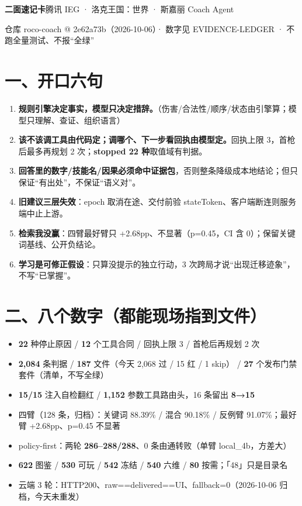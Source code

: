 \documentclass[10pt,a4paper,fontset=fandol]{ctexart}
\newcommand{\x}[1]{\textcolor{mainblue}{\textbf{#1}}}
\begin{document}
{\LARGE\bfseries 二面速记卡}\hfill{\small\color{subgray}腾讯 IEG · 洛克王国：世界 · 斯嘉丽 Coach Agent}\par
\vspace{1pt}
{\scriptsize\color{subgray}仓库 roco-coach @ 2e62a73b（2026-10-06）· 数字见 EVIDENCE-LEDGER · 不跑全量测试、不报“全绿”}\par

\section*{一、开口六句}
\begin{enumerate}[leftmargin=1.4em,itemsep=1.2pt,topsep=1pt]
\item \x{规则引擎决定事实，模型只决定措辞。}（伤害/合法性/顺序/状态由引擎算；模型只理解、查证、组织语言）
\item \x{该不该调工具由代码定；调哪个、下一步看回执由模型定。}回执上限 3，首枪后最多再规划 2 次；\x{stopped 22 种}取值域有判据。
\item \x{回答里的数字/技能名/因果必须命中证据包}，否则整条降级成本地结论；但只保证“有出处”，不保证“语义对”。
\item \x{旧建议三层失效}：epoch 取消在途、交付前验 stateToken、客户端断连则服务端中止上游。
\item \x{检索我没赢}：四臂最好臂只 +2.68pp、不显著（p=0.45，CI 含 0）；保留关键词基线、公开负结论。
\item \x{学习是可修正假设}：只算没提示的独立行动，3 次跨局才说“出现迁移迹象”，不写“已掌握”。
\end{enumerate}

\section*{二、八个数字（都能现场指到文件）}
{\small
\begin{itemize}
\item \x{22} 种停止原因 / \x{12} 个工具合同 / 回执上限 3 / 首枪后再规划 2 次
\item \x{2,084} 条判据 / \x{187} 文件（今天 2,068 过 / 15 红 / 1 skip） / \x{27} 个发布门禁套件（清单，不写全绿）
\item \x{15/15} 注入自检翻红 / \x{1,152} 参数工具路由头，16 条留出 \x{8→15}
\item 四臂（128 条，归档）：关键词 88.39\% / 混合 90.18\% / 反例臂 91.07\%；最好臂 +2.68pp、p=0.45 不显著
\item policy-first：两轮 \x{286–288/288}、0 条由通转败（单臂 local\_4b，方差大）
\item \x{622} 图鉴 / \x{530} 可玩 / \x{542} 冻结 / \x{540} 六维 / \x{80} 按需；「48」只是目录名
\item 云端 3 轮：HTTP200、raw==delivered==UI、fallback=0（2026-10-06 归档，今天未重发）
\end{itemize}}
\end{document}
